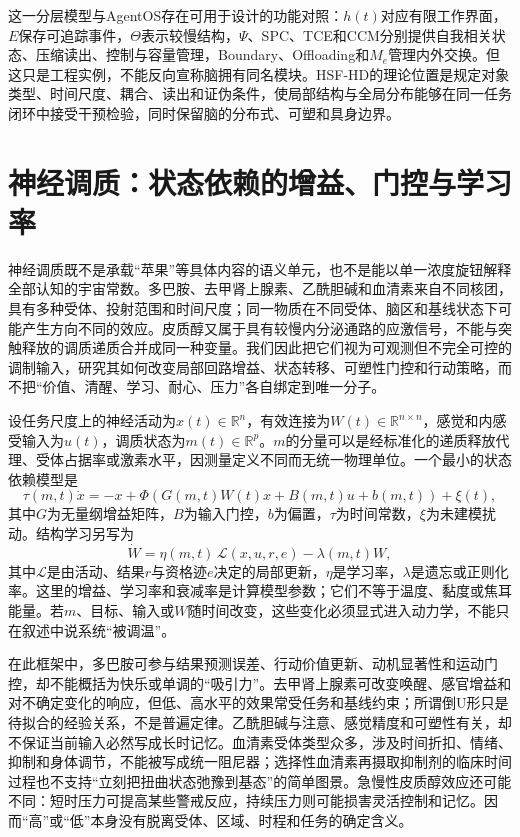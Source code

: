 这一分层模型与AgentOS存在可用于设计的功能对照：$h(t)$对应有限工作界面，$E$保存可追踪事件，$\Theta$表示较慢结构，$\Psi$、SPC、TCE和CCM分别提供自我相关状态、压缩读出、控制与容量管理，Boundary、Offloading和$M_e$管理内外交换。但这只是工程实例，不能反向宣称脑拥有同名模块。HSF-HD的理论位置是规定对象类型、时间尺度、耦合、读出和证伪条件，使局部结构与全局分布能够在同一任务闭环中接受干预检验，同时保留脑的分布式、可塑和具身边界。

\section{神经调质：状态依赖的增益、门控与学习率}
\label{sec:neuromodulator_physics}

神经调质既不是承载“苹果”等具体内容的语义单元，也不是能以单一浓度旋钮解释全部认知的宇宙常数。多巴胺、去甲肾上腺素、乙酰胆碱和血清素来自不同核团，具有多种受体、投射范围和时间尺度；同一物质在不同受体、脑区和基线状态下可能产生方向不同的效应。皮质醇又属于具有较慢内分泌通路的应激信号，不能与突触释放的调质递质合并成同一种变量。我们因此把它们视为可观测但不完全可控的调制输入，研究其如何改变局部回路增益、状态转移、可塑性门控和行动策略，而不把“价值、清醒、学习、耐心、压力”各自绑定到唯一分子。

设任务尺度上的神经活动为$x(t)\in\mathbb R^n$，有效连接为$W(t)\in\mathbb R^{n\times n}$，感觉和内感受输入为$u(t)$，调质状态为$m(t)\in\mathbb R^p$。$m$的分量可以是经标准化的递质释放代理、受体占据率或激素水平，因测量定义不同而无统一物理单位。一个最小的状态依赖模型是
\begin{equation}
 \tau(m,t)\dot x=-x+\Phi\!\left(G(m,t)W(t)x+B(m,t)u+b(m,t)\right)+\xi(t),
\end{equation}
其中$G$为无量纲增益矩阵，$B$为输入门控，$b$为偏置，$\tau$为时间常数，$\xi$为未建模扰动。结构学习另写为
\begin{equation}
 \dot W=\eta(m,t)\,\mathcal L(x,u,r,e)-\lambda(m,t)W,
\end{equation}
其中$\mathcal L$是由活动、结果$r$与资格迹$e$决定的局部更新，$\eta$是学习率，$\lambda$是遗忘或正则化率。这里的增益、学习率和衰减率是计算模型参数；它们不等于温度、黏度或焦耳能量。若$m$、目标、输入或$W$随时间改变，这些变化必须显式进入动力学，不能只在叙述中说系统“被调温”。

在此框架中，多巴胺可参与结果预测误差、行动价值更新、动机显著性和运动门控，却不能概括为快乐或单调的“吸引力”。去甲肾上腺素可改变唤醒、感官增益和对不确定变化的响应，但低、高水平的效果常受任务和基线约束；所谓倒U形只是待拟合的经验关系，不是普遍定律。乙酰胆碱与注意、感觉精度和可塑性有关，却不保证当前输入必然写成长时记忆。血清素受体类型众多，涉及时间折扣、情绪、抑制和身体调节，不能被写成统一阻尼器；选择性血清素再摄取抑制剂的临床时间过程也不支持“立刻把扭曲状态弛豫到基态”的简单图景。急慢性皮质醇效应还可能不同：短时压力可提高某些警戒反应，持续压力则可能损害灵活控制和记忆。因而“高”或“低”本身没有脱离受体、区域、时程和任务的确定含义。

